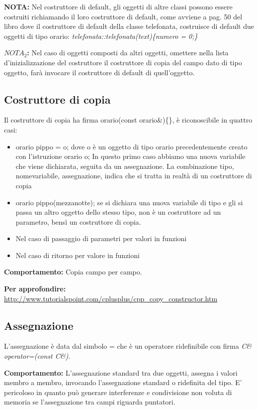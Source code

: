 \textbf{NOTA:} Nel costruttore di default, gli oggetti di altre classi possono essere costruiti richiamando il loro costruttore di default, come avviene a pag. 50 del libro dove il costruttore di default della classe telefonata, costruisce di default due oggetti di tipo orario:
\textit{telefonata::telefonata(text)\{numero = 0;\}}

\textbf{$NOTA_{2}$:} Nel caso di oggetti composti da altri oggetti, omettere nella lista d'inizializzazione del costruttore il costruttore di copia del campo dato di tipo oggetto, farà invocare il costruttore di default di quell'oggetto.

\subsection{Costruttore di copia}
Il costruttore di copia ha firma orario(const orario\&)\{\}, è riconoscibile in quattro casi:
\begin{itemize}
	\item orario pippo = o; dove o è un oggetto di tipo orario precedentemente creato con l'istruzione orario o; In questo primo caso abbiamo una nuova variabile che viene dichiarata, seguita da un assegnazione. La combinazione tipo, nomevariabile, assegnazione, indica che si tratta in realtà di un costruttore di copia
	\item orario pippo(mezzanotte); se si dichiara una nuova variabile di tipo e gli si passa un altro oggetto dello stesso tipo, non è un costruttore ad un parametro, bensì un costruttore di copia.
	\item Nel caso di passaggio di parametri per valori in funzioni
	\item Nel caso di ritorno per valore in funzioni
\end{itemize} 

\textbf{Comportamento:} Copia campo per campo.

\textbf{Per approfondire:} \url{http://www.tutorialspoint.com/cplusplus/cpp_copy_constructor.htm}

\subsection{Assegnazione}
L'assegnazione è data dal simbolo = che è un operatore ridefinibile con firma \textit{C\& operator=(const C\&)}. 

\textbf{Comportamento:} L'assegnazione standard tra due oggetti, assegna i valori membro a membro, invocando l'assegnazione standard o ridefinita del tipo.
E' pericoloso in quanto può generare interferenze e condivisione non voluta di memoria se l'assegnazione tra campi riguarda puntatori.

